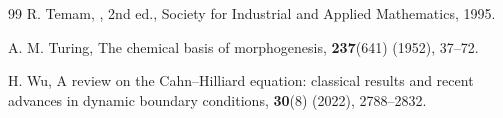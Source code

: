 \documentclass[12pt]{article}
\theoremstyle{plain}
\theoremstyle{remark}
\begin{document}
\begin{thebibliography}{99}
R. Temam,
,
\newblock 2nd ed., Society for Industrial and Applied Mathematics, 1995.


A. M. Turing, 
\newblock The chemical basis of morphogenesis, 
 \textbf{237}(641) (1952), 37--72.

H. Wu, 
\newblock A review on the Cahn--Hilliard equation: classical results and recent advances in dynamic boundary conditions, 
 \textbf{30}(8) (2022), 2788--2832.

\end{thebibliography}
\end{document}
